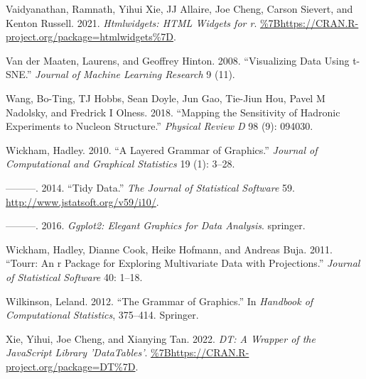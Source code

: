 \begin{CSLReferences}{1}{0}
\leavevmode{}%
Vaidyanathan, Ramnath, Yihui Xie, JJ Allaire, Joe Cheng, Carson Sievert, and Kenton Russell. 2021. \emph{Htmlwidgets: HTML Widgets for r}. \url{\%7Bhttps://CRAN.R-project.org/package=htmlwidgets\%7D}.

\leavevmode{}%
Van der Maaten, Laurens, and Geoffrey Hinton. 2008. {``Visualizing Data Using t-SNE.''} \emph{Journal of Machine Learning Research} 9 (11).

\leavevmode{}%
Wang, Bo-Ting, TJ Hobbs, Sean Doyle, Jun Gao, Tie-Jiun Hou, Pavel M Nadolsky, and Fredrick I Olness. 2018. {``Mapping the Sensitivity of Hadronic Experiments to Nucleon Structure.''} \emph{Physical Review D} 98 (9): 094030.

\leavevmode{}%
Wickham, Hadley. 2010. {``A Layered Grammar of Graphics.''} \emph{Journal of Computational and Graphical Statistics} 19 (1): 3--28.

\leavevmode{}%
---------. 2014. {``Tidy Data.''} \emph{The Journal of Statistical Software} 59. \url{http://www.jstatsoft.org/v59/i10/}.

\leavevmode{}%
---------. 2016. \emph{Ggplot2: Elegant Graphics for Data Analysis}. springer.

\leavevmode{}%
Wickham, Hadley, Dianne Cook, Heike Hofmann, and Andreas Buja. 2011. {``Tourr: An r Package for Exploring Multivariate Data with Projections.''} \emph{Journal of Statistical Software} 40: 1--18.

\leavevmode{}%
Wilkinson, Leland. 2012. {``The Grammar of Graphics.''} In \emph{Handbook of Computational Statistics}, 375--414. Springer.

\leavevmode{}%
Xie, Yihui, Joe Cheng, and Xianying Tan. 2022. \emph{DT: A Wrapper of the JavaScript Library 'DataTables'}. \url{\%7Bhttps://CRAN.R-project.org/package=DT\%7D}.

\end{CSLReferences}



\address{%
Casper Hart\\
University of Auckland\\%
Department of Statistics\\
%
%
%
\href{mailto:casperhart93@gmail.com}{\nolinkurl{casperhart93@gmail.com}}%
}

\address{%
Earo Wang\\
The University of Auckland\\%
Department of Statistics\\
%
%
%
\href{mailto:earo.wang@gmail.com}{\nolinkurl{earo.wang@gmail.com}}%
}

